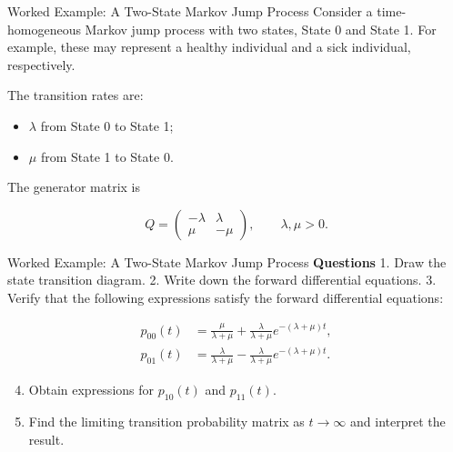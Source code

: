 \documentclass[
  ignorenonframetext,
  aspectratio=169,
]{beamer}
\providecommand{\tightlist}{%
  \setlength{\itemsep}{0pt}\setlength{\parskip}{0pt}}
\begin{document}
\begin{frame}{Worked Example: A Two-State Markov Jump Process}
\protect{}\label{worked-example-a-two-state-markov-jump-process-1}
Consider a time-homogeneous Markov jump process with two states, State 0
and State 1. For example, these may represent a healthy individual and a
sick individual, respectively.

The transition rates are:

\begin{itemize}
\tightlist
\item
  \(\lambda\) from State 0 to State 1;
\item
  \(\mu\) from State 1 to State 0.
\end{itemize}

The generator matrix is

\[
Q=
\begin{pmatrix}
-\lambda & \lambda\\
\mu & -\mu
\end{pmatrix},
\qquad \lambda,\mu>0.
\]
\end{frame}

\begin{frame}{Worked Example: A Two-State Markov Jump Process}
\protect{}\label{worked-example-a-two-state-markov-jump-process-2}
\textbf{Questions} 1. Draw the state transition diagram. 2. Write down
the forward differential equations. 3. Verify that the following
expressions satisfy the forward differential equations:

\[
\begin{aligned}
p_{00}(t)
&=\frac{\mu}{\lambda+\mu}
+\frac{\lambda}{\lambda+\mu}
e^{-(\lambda+\mu)t},\\
p_{01}(t)
&=\frac{\lambda}{\lambda+\mu}
-\frac{\lambda}{\lambda+\mu}
e^{-(\lambda+\mu)t}.
\end{aligned}
\]

\begin{enumerate}
\setcounter{enumi}{3}
\tightlist
\item
  Obtain expressions for \(p_{10}(t)\) and \(p_{11}(t)\).
\item
  Find the limiting transition probability matrix as \(t\to\infty\) and
  interpret the result.
\end{enumerate}
\end{frame}
\end{document}
